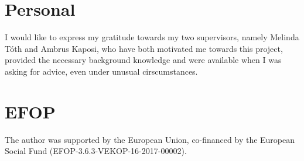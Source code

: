 \documentclass[runningheads,a4paper]{report}
\theoremstyle{definition}
\begin{document}
\section{Personal}
{\Large I would like to express my gratitude towards my two supervisors, namely Melinda Tóth and Ambrus Kaposi, who have both motivated me towards this project, provided the necessary background knowledge and were available when I was asking for advice, even under unusual cirscumstances.}

\section{EFOP}
{\Large The author was supported by the European Union, co-financed by the European Social Fund (EFOP-3.6.3-VEKOP-16-2017-00002).}


\newpage
{}


  
% 


{}




\end{document}
